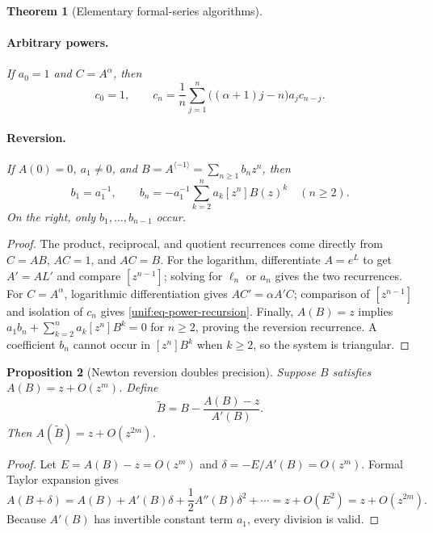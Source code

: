 \documentclass[11pt,a4paper,oneside,openany]{book}
\newtheorem{theorem}{Theorem}[chapter]
\newtheorem{proposition}[theorem]{Proposition}
\theoremstyle{definition}
\theoremstyle{remark}
\begin{document}
\begin{theorem}[Elementary formal-series algorithms]
\paragraph{Arbitrary powers.} If $a_0=1$ and $C=A^\alpha$, then
\begin{equation}\label{unif:eq-power-recursion}
 c_0=1,
 \qquad c_n=\frac1n\sum_{j=1}^{n}\bigl((\alpha+1)j-n\bigr)a_jc_{n-j}.
\end{equation}

\paragraph{Reversion.} If $A(0)=0$, $a_1\ne0$, and
$B=A^{\langle-1\rangle}=\sum_{n\ge1}b_nz^n$, then
\begin{equation}\label{unif:eq-reversion-triangular}
 b_1=a_1^{-1},\qquad
 b_n=-a_1^{-1}\sum_{k=2}^{n}a_k[z^n]B(z)^k\quad(n\ge2).
\end{equation}
On the right, only $b_1,\ldots,b_{n-1}$ occur.
\end{theorem}
\begin{proof}
The product, reciprocal, and quotient recurrences come directly from
$C=AB$, $AC=1$, and $AC=B$. For the logarithm, differentiate $A=e^L$ to get
$A'=AL'$ and compare $[z^{n-1}]$; solving for $\ell_n$ or $a_n$ gives the two
recurrences. For $C=A^\alpha$, logarithmic differentiation gives
$AC'=\alpha A'C$; comparison of $[z^{n-1}]$ and isolation of $c_n$ gives
\eqref{unif:eq-power-recursion}. Finally, $A(B)=z$ implies
$a_1b_n+\sum_{k=2}^{n}a_k[z^n]B^k=0$ for $n\ge2$, proving the reversion
recurrence. A coefficient $b_n$ cannot occur in $[z^n]B^k$ when $k\ge2$, so
the system is triangular.
\end{proof}

\begin{proposition}[Newton reversion doubles precision]
\label{unif:prop-newton-reversion}
Suppose $B$ satisfies $A(B)=z+O(z^m)$. Define
\begin{equation}\label{unif:eq-newton-reversion}
 \widetilde B=B-\frac{A(B)-z}{A'(B)}.
\end{equation}
Then $A(\widetilde B)=z+O(z^{2m})$.
\end{proposition}
\begin{proof}
Let $E=A(B)-z=O(z^m)$ and $\delta=-E/A'(B)=O(z^m)$. Formal Taylor expansion
gives
\[
 A(B+\delta)=A(B)+A'(B)\delta+\frac12A''(B)\delta^2+\cdots
 =z+O(E^2)=z+O(z^{2m}).
\]
Because $A'(B)$ has invertible constant term $a_1$, every division is valid.
\end{proof}
\end{document}
